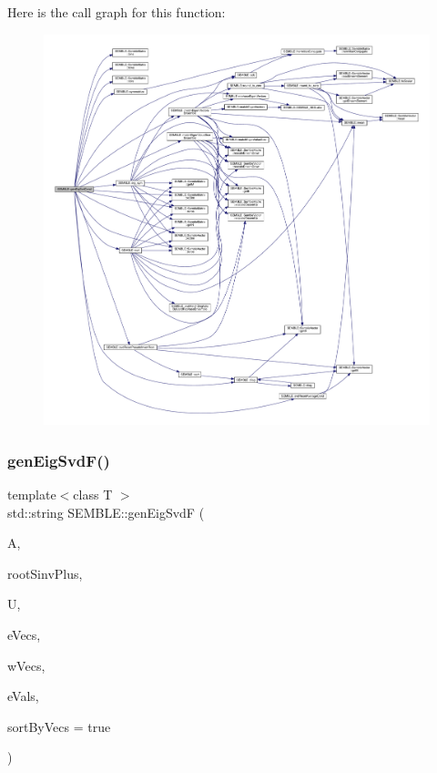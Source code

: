 Here is the call graph for this function\+:
\nopagebreak
\begin{figure}[H]
\begin{center}
\leavevmode
\includegraphics[width=350pt]{d7/dfd/namespaceSEMBLE_abef6ebd7bb063b0d69ba782471f9e4a5_cgraph}
\end{center}
\end{figure}
\mbox{\label{namespaceSEMBLE_a4aaeea64468bfb9ed46e42fd7d0eaa24}} 
\subsubsection{\texorpdfstring{genEigSvdF()}{genEigSvdF()}}
{\footnotesize\ttfamily template$<$class T $>$ \\
std\+::string S\+E\+M\+B\+L\+E\+::gen\+Eig\+SvdF (\begin{DoxyParamCaption}\item[{const \mbox{\hyperlink{structSEMBLE_1_1SembleMatrix}{Semble\+Matrix}}$<$ T $>$ \&}]{A,  }\item[{const \mbox{\hyperlink{structSEMBLE_1_1SembleMatrix}{Semble\+Matrix}}$<$ double $>$ \&}]{root\+Sinv\+Plus,  }\item[{const \mbox{\hyperlink{structSEMBLE_1_1SembleMatrix}{Semble\+Matrix}}$<$ T $>$ \&}]{U,  }\item[{\mbox{\hyperlink{structSEMBLE_1_1SembleMatrix}{Semble\+Matrix}}$<$ T $>$ \&}]{e\+Vecs,  }\item[{\mbox{\hyperlink{structSEMBLE_1_1SembleMatrix}{Semble\+Matrix}}$<$ T $>$ \&}]{w\+Vecs,  }\item[{\mbox{\hyperlink{structSEMBLE_1_1SembleVector}{Semble\+Vector}}$<$ double $>$ \&}]{e\+Vals,  }\item[{const bool}]{sort\+By\+Vecs = {\ttfamily true} }\end{DoxyParamCaption})}

